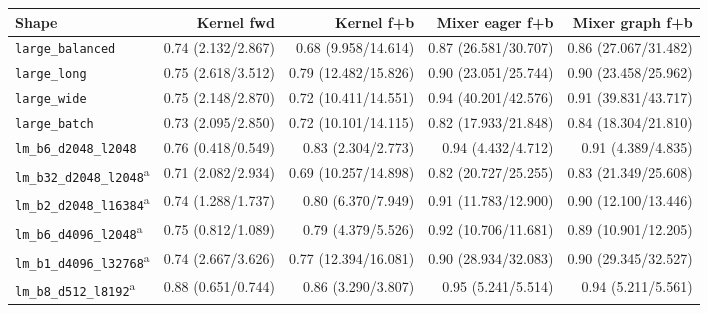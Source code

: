 \begin{tabular}{@{}lrrrr@{}}
\toprule
Shape & Kernel fwd & Kernel f+b & Mixer eager f+b & Mixer graph f+b \\
\midrule
\texttt{large\_balanced} & 0.74 (2.132/2.867) & 0.68 (9.958/14.614) & 0.87 (26.581/30.707) & 0.86 (27.067/31.482) \\
\texttt{large\_long} & 0.75 (2.618/3.512) & 0.79 (12.482/15.826) & 0.90 (23.051/25.744) & 0.90 (23.458/25.962) \\
\texttt{large\_wide} & 0.75 (2.148/2.870) & 0.72 (10.411/14.551) & 0.94 (40.201/42.576) & 0.91 (39.831/43.717) \\
\texttt{large\_batch} & 0.73 (2.095/2.850) & 0.72 (10.101/14.115) & 0.82 (17.933/21.848) & 0.84 (18.304/21.810) \\
\texttt{lm\_b6\_d2048\_l2048} & 0.76 (0.418/0.549) & 0.83 (2.304/2.773) & 0.94 (4.432/4.712) & 0.91 (4.389/4.835) \\
\texttt{lm\_b32\_d2048\_l2048}\textsuperscript{a} & 0.71 (2.082/2.934) & 0.69 (10.257/14.898) & 0.82 (20.727/25.255) & 0.83 (21.349/25.608) \\
\texttt{lm\_b2\_d2048\_l16384}\textsuperscript{a} & 0.74 (1.288/1.737) & 0.80 (6.370/7.949) & 0.91 (11.783/12.900) & 0.90 (12.100/13.446) \\
\texttt{lm\_b6\_d4096\_l2048}\textsuperscript{a} & 0.75 (0.812/1.089) & 0.79 (4.379/5.526) & 0.92 (10.706/11.681) & 0.89 (10.901/12.205) \\
\texttt{lm\_b1\_d4096\_l32768}\textsuperscript{a} & 0.74 (2.667/3.626) & 0.77 (12.394/16.081) & 0.90 (28.934/32.083) & 0.90 (29.345/32.527) \\
\texttt{lm\_b8\_d512\_l8192}\textsuperscript{a} & 0.88 (0.651/0.744) & 0.86 (3.290/3.807) & 0.95 (5.241/5.514) & 0.94 (5.211/5.561) \\
\bottomrule
\end{tabular}

